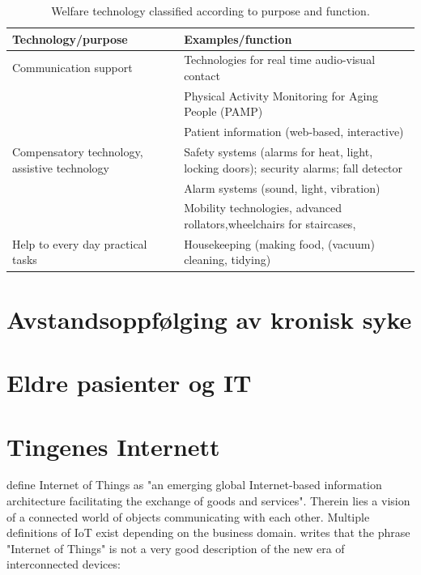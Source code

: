 
\begin{table}[!ht]
\setlength\extrarowheight{2pt} %
\centering
\begin{tabularx}{\textwidth}{|X|X|}
\hline
\textbf{Technology/purpose} & \textbf{Examples/function} \\ \hline
Communication support & Technologies for real time audio-visual contact \\ \hline
 & Physical Activity Monitoring for Aging People (PAMP) \\ \hline
 & Patient information (web-based, interactive) \\ \hline
Compensatory technology, assistive technology & Safety systems (alarms for heat, light, locking doors);
  security alarms; fall detector \\ \hline
  & Alarm systems (sound, light, vibration) \\ \hline
  & Mobility technologies, advanced rollators,wheelchairs for staircases, \\ \hline
Help to every day practical tasks & Housekeeping (making food, (vacuum) cleaning, tidying) \\ \hline

\end{tabularx}
\caption{Welfare technology classified according to purpose and function. \citep{welfare_ethical}}
\label{table:welfare_definition}
\end{table}


\section{Avstandsoppfølging av kronisk syke}
\blindtext

\section{Eldre pasienter og IT}
\blindtext

\section{Tingenes Internett}
\citet{iot_legal} define Internet of Things as "an emerging global
Internet-based information architecture facilitating the exchange of
goods and services". Therein lies a vision of a connected world of objects
communicating with each other. Multiple definitions of IoT exist depending on the business domain.
\citet{iot_harvard_smart} writes that the phrase "Internet of Things" is not a very good description
of the new era of interconnected devices:


